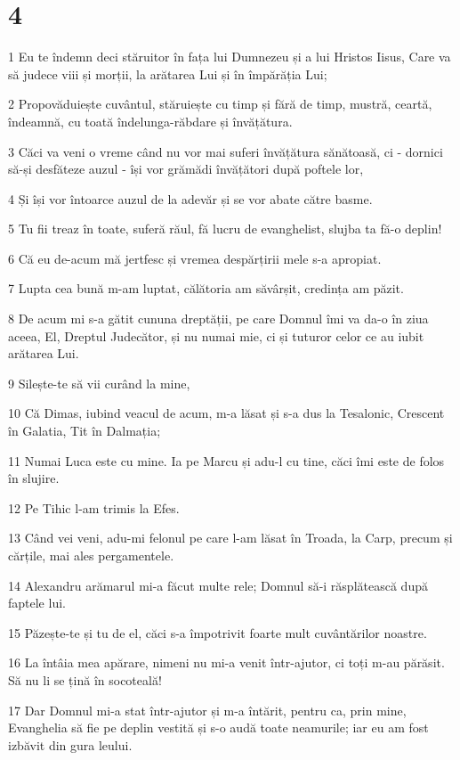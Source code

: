 \chapter{4}

\par 1 Eu te îndemn deci stăruitor în fața lui Dumnezeu și a lui Hristos Iisus, Care va să judece viii și morții, la arătarea Lui și în împărăția Lui;
\par 2 Propovăduiește cuvântul, stăruiește cu timp și fără de timp, mustră, ceartă, îndeamnă, cu toată îndelunga-răbdare și învățătura.
\par 3 Căci va veni o vreme când nu vor mai suferi învățătura sănătoasă, ci - dornici să-și desfăteze auzul - își vor grămădi învățători după poftele lor,
\par 4 Și își vor întoarce auzul de la adevăr și se vor abate către basme.
\par 5 Tu fii treaz în toate, suferă răul, fă lucru de evanghelist, slujba ta fă-o deplin!
\par 6 Că eu de-acum mă jertfesc și vremea despărțirii mele s-a apropiat.
\par 7 Lupta cea bună m-am luptat, călătoria am săvârșit, credința am păzit.
\par 8 De acum mi s-a gătit cununa dreptății, pe care Domnul îmi va da-o în ziua aceea, El, Dreptul Judecător, și nu numai mie, ci și tuturor celor ce au iubit arătarea Lui.
\par 9 Silește-te să vii curând la mine,
\par 10 Că Dimas, iubind veacul de acum, m-a lăsat și s-a dus la Tesalonic, Crescent în Galatia, Tit în Dalmația;
\par 11 Numai Luca este cu mine. Ia pe Marcu și adu-l cu tine, căci îmi este de folos în slujire.
\par 12 Pe Tihic l-am trimis la Efes.
\par 13 Când vei veni, adu-mi felonul pe care l-am lăsat în Troada, la Carp, precum și cărțile, mai ales pergamentele.
\par 14 Alexandru arămarul mi-a făcut multe rele; Domnul să-i răsplătească după faptele lui.
\par 15 Păzește-te și tu de el, căci s-a împotrivit foarte mult cuvântărilor noastre.
\par 16 La întâia mea apărare, nimeni nu mi-a venit într-ajutor, ci toți m-au părăsit. Să nu li se țină în socoteală!
\par 17 Dar Domnul mi-a stat într-ajutor și m-a întărit, pentru ca, prin mine, Evanghelia să fie pe deplin vestită și s-o audă toate neamurile; iar eu am fost izbăvit din gura leului.
